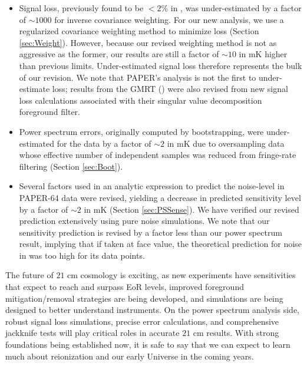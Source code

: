 \documentclass[preprint2,numberedappendix,tighten]{aastex6}  %
\begin{document}
\begin{itemize}
\item Signal loss, previously found to be $<2\%$ in , was under-estimated by a factor of $\sim$$1000$ for inverse 
covariance weighting. For our new analysis, we use a regularized covariance weighting method to minimize loss (Section 
\ref{sec:Weight}). However, because our revised weighting method is not as aggressive as the former, our results are still a 
factor of $\sim$$10$ in mK higher than previous limits. Under-estimated signal loss therefore represents the bulk of our revision. We 
note that PAPER's analysis is not the first to under-estimate loss; results from the GMRT (\citealt{paciga_et_al2013}) were also 
revised from new signal loss calculations associated with their singular value decomposition foreground filter.
\item Power spectrum errors, originally computed by bootstrapping, were under-estimated for the data by a factor of $\sim$$2$ in mK due to oversampling data whose effective number of independent samples was reduced from fringe-rate filtering (Section \ref{sec:Boot}). 
\item Several factors used in an analytic expression to predict the noise-level in PAPER-64 data were revised, yielding a 
decrease in predicted sensitivity level by a factor of $\sim$$2$ in mK (Section \ref{sec:PSSense}). We have verified our revised 
prediction extensively using pure noise simulations. We note that our sensitivity prediction is revised by a factor less than our 
power spectrum result, implying that if taken at face value, the theoretical prediction for noise in  was too high for its data 
points.
\end{itemize}

The future of $21$ cm cosmology is exciting, as new experiments have sensitivities that expect to reach and surpass EoR levels, improved 
foreground mitigation/removal strategies are being developed, and simulations are being designed to better understand 
instruments. On the power spectrum analysis side, robust signal loss simulations, precise error calculations, and 
comprehensive jackknife tests will play critical roles in accurate $21$ cm results. With strong foundations being established now, it is safe to say that we can expect to learn much about reionization and our early Universe in the coming years.


\end{document}
